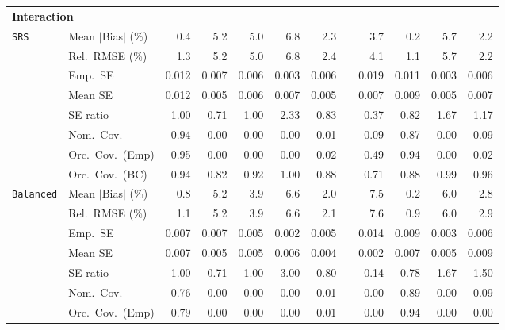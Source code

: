 \begin{landscape}
\begin{longtable}{llrrrrrrrrrr}
\multicolumn{12}{l}{\textbf{Interaction}} \\
\addlinespace[2pt]
\quad \texttt{SRS} & Mean $|$Bias$|$ (\%) & \cellcolor{ranktwo}0.4 & 5.2 & 5.0 & 6.8 & 2.3 &  & 3.7 & \cellcolor{rankone}0.2 & 5.7 & \cellcolor{rankthree}2.2 \\
 & Rel.\ RMSE (\%) & \cellcolor{ranktwo}1.3 & 5.2 & 5.0 & 6.8 & 2.4 &  & 4.1 & \cellcolor{rankone}1.1 & 5.7 & \cellcolor{rankthree}2.2 \\
 & Emp.\ SE & 0.012 & 0.007 & 0.006 & 0.003 & 0.006 &  & 0.019 & 0.011 & 0.003 & 0.006 \\
 & Mean SE & 0.012 & 0.005 & 0.006 & 0.007 & 0.005 &  & 0.007 & 0.009 & 0.005 & 0.007 \\
 & SE ratio & \cellcolor{rankone}1.00 & 0.71 & \cellcolor{ranktwo}1.00 & 2.33 & \cellcolor{rankthree}0.83 &  & 0.37 & 0.82 & 1.67 & 1.17 \\
 & Nom.\ Cov. & \cellcolor{rankone}0.94 & 0.00 & 0.00 & 0.00 & 0.01 &  & \cellcolor{rankthree}0.09 & \cellcolor{ranktwo}0.87 & 0.00 & 0.09 \\
 & Orc.\ Cov.\ (Emp) & \cellcolor{rankone}0.95 & 0.00 & 0.00 & 0.00 & 0.02 &  & \cellcolor{rankthree}0.49 & \cellcolor{ranktwo}0.94 & 0.00 & 0.02 \\
 & Orc.\ Cov.\ (BC) & \cellcolor{rankone}0.94 & 0.82 & \cellcolor{rankthree}0.92 & 1.00 & 0.88 &  & 0.71 & 0.88 & 0.99 & \cellcolor{ranktwo}0.96 \\
\addlinespace[2pt]
\quad \texttt{Balanced} & Mean $|$Bias$|$ (\%) & \cellcolor{ranktwo}0.8 & 5.2 & 3.9 & 6.6 & \cellcolor{rankthree}2.0 &  & 7.5 & \cellcolor{rankone}0.2 & 6.0 & 2.8 \\
 & Rel.\ RMSE (\%) & \cellcolor{ranktwo}1.1 & 5.2 & 3.9 & 6.6 & \cellcolor{rankthree}2.1 &  & 7.6 & \cellcolor{rankone}0.9 & 6.0 & 2.9 \\
 & Emp.\ SE & 0.007 & 0.007 & 0.005 & 0.002 & 0.005 &  & 0.014 & 0.009 & 0.003 & 0.006 \\
 & Mean SE & 0.007 & 0.005 & 0.005 & 0.006 & 0.004 &  & 0.002 & 0.007 & 0.005 & 0.009 \\
 & SE ratio & \cellcolor{rankone}1.00 & 0.71 & \cellcolor{ranktwo}1.00 & 3.00 & \cellcolor{rankthree}0.80 &  & 0.14 & 0.78 & 1.67 & 1.50 \\
 & Nom.\ Cov. & \cellcolor{ranktwo}0.76 & 0.00 & 0.00 & 0.00 & 0.01 &  & 0.00 & \cellcolor{rankone}0.89 & 0.00 & \cellcolor{rankthree}0.09 \\
 & Orc.\ Cov.\ (Emp) & \cellcolor{ranktwo}0.79 & 0.00 & 0.00 & 0.00 & \cellcolor{rankthree}0.01 &  & 0.00 & \cellcolor{rankone}0.94 & 0.00 & 0.00 \\

\end{longtable}
\end{landscape}
